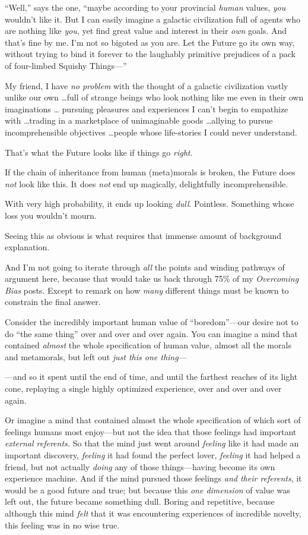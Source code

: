 {
 ``Well,'' says the one,
``maybe according to your provincial \textit{human}
values, \textit{you} wouldn't like it. But I can easily
imagine a galactic civilization full of agents who are nothing like
\textit{you}, yet find great value and interest in their \textit{own}
goals. And that's fine by me. I'm not
so bigoted as you are. Let the Future go its own way, without trying to
bind it forever to the laughably primitive prejudices of a pack of
four-limbed Squishy Things---''}

{
 My friend, I have \textit{no problem} with the thought of a
galactic civilization vastly unlike our own \ldots full of strange
beings who look nothing like me even in their own imaginations \ldots
pursuing pleasures and experiences I can't begin to
empathize with \ldots trading in a marketplace of unimaginable goods
\ldots allying to pursue incomprehensible objectives \ldots people whose
life-stories I could never understand.}

{
 That's what the Future looks like if things go
\textit{right}.}

{
 If the chain of inheritance from human (meta)morals is broken, the
Future does \textit{not} look like this. It does \textit{not} end up
magically, delightfully incomprehensible.}

{
 With very high probability, it ends up looking \textit{dull}.
Pointless. Something whose loss you wouldn't mourn.}

{
 Seeing this as obvious is what requires that immense amount of
background explanation.}

{
 And I'm not going to iterate through \textit{all}
the points and winding pathways of argument here, because that would
take us back through 75\% of my \textit{Overcoming Bias} posts. Except
to remark on how \textit{many} different things must be known to
constrain the final answer.}

{
 Consider the incredibly important human value of
``boredom''{}---our desire not to do
``the same thing'' over and over and
over again. You can imagine a mind that contained \textit{almost} the
whole specification of human value, almost all the morals and
metamorals, but left out \textit{just this one thing}{}---}

{
 {}---and so it spent until the end of time, and until the farthest
reaches of its light cone, replaying a single highly optimized
experience, over and over and over again.}

{
 Or imagine a mind that contained almost the whole specification of
which sort of feelings humans most enjoy---but not the idea that those
feelings had important \textit{external referents.} So that the mind
just went around \textit{feeling} like it had made an important
discovery, \textit{feeling} it had found the perfect lover,
\textit{feeling} it had helped a friend, but not actually
\textit{doing} any of those things---having become its own experience
machine. And if the mind pursued those feelings \textit{and their
referents}, it would be a good future and true; but because this
\textit{one dimension} of value was left out, the future became
something dull. Boring and repetitive, because although this mind
\textit{felt} that it was encountering experiences of incredible
novelty, this feeling was in no wise true.}

